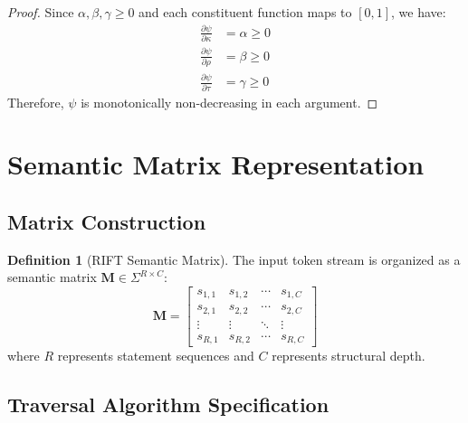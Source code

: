 \documentclass[11pt,a4paper]{article}
\theoremstyle{definition}
\newtheorem{definition}[theorem]{Definition}
\theoremstyle{remark}
\newcommand{\riftmatrix}[1]{\ensuremath{\mathbf{#1}}}
\begin{document}
\begin{proof}
Since $\alpha, \beta, \gamma \geq 0$ and each constituent function maps to $[0,1]$, we have:
\begin{align}
\frac{\partial \psi}{\partial \kappa} &= \alpha \geq 0 \\
\frac{\partial \psi}{\partial \rho} &= \beta \geq 0 \\
\frac{\partial \psi}{\partial \tau} &= \gamma \geq 0
\end{align}
Therefore, $\psi$ is monotonically non-decreasing in each argument.
\end{proof}


\section{Semantic Matrix Representation}
\label{sec:matrix-representation}

\subsection{Matrix Construction}
\label{subsec:matrix-construction}

\begin{definition}[RIFT Semantic Matrix]
The input token stream is organized as a semantic matrix $\riftmatrix{M} \in \Sigma^{R \times C}$:
\begin{equation}
\riftmatrix{M} = \begin{bmatrix}
s_{1,1} & s_{1,2} & \cdots & s_{1,C} \\
s_{2,1} & s_{2,2} & \cdots & s_{2,C} \\
\vdots & \vdots & \ddots & \vdots \\
s_{R,1} & s_{R,2} & \cdots & s_{R,C}
\end{bmatrix}
\end{equation}
where $R$ represents statement sequences and $C$ represents structural depth.
\end{definition}

\subsection{Traversal Algorithm Specification}
\label{subsec:traversal-algorithm}
\end{document}
